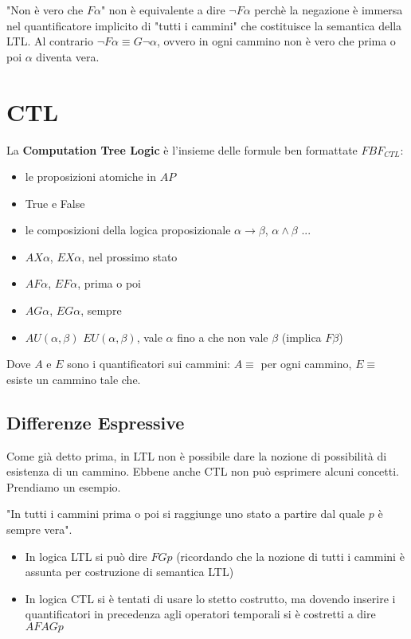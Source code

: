 "Non \`e vero che $F\alpha$" non \`e equivalente a dire $\neg F\alpha$ perch\`e la negazione \`e immersa nel quantificatore implicito di "tutti i cammini" che costituisce la semantica della LTL. Al contrario $\neg F\alpha \equiv G \neg \alpha$, ovvero in ogni cammino non \`e vero che prima o poi $\alpha$ diventa vera.

\section{CTL}

La \textbf{Computation Tree Logic} \`e l'insieme delle formule ben formattate $FBF_{CTL}$:
\begin{itemize}
    \item le proposizioni atomiche in $AP$
    \item True e False
    \item le composizioni della logica proposizionale $\alpha \rightarrow \beta$, $\alpha \land \beta$ ...
    \item $AX\alpha$, $EX\alpha$, nel prossimo stato
    \item $AF\alpha$, $EF\alpha$, prima o poi
    \item $AG\alpha$, $EG\alpha$, sempre
    \item $AU(\alpha, \beta)$ $EU(\alpha, \beta)$, vale $\alpha$ fino a che non vale $\beta$ (implica $F\beta$)
\end{itemize}

Dove $A$ e $E$ sono i quantificatori sui cammini: $A \equiv$ per ogni cammino, $E \equiv$ esiste un cammino tale che.

\subsection{Differenze Espressive}

Come gi\`a detto prima, in LTL non \`e possibile dare la nozione di possibilit\`a di esistenza di un cammino. Ebbene anche CTL non pu\`o esprimere alcuni concetti. Prendiamo un esempio.

"In tutti i cammini prima o poi si raggiunge uno stato a partire dal quale $p$ \`e sempre vera".

\begin{itemize}
  \item In logica LTL si pu\`o dire $FGp$ (ricordando che la nozione di tutti i cammini \`e assunta per costruzione di semantica LTL)
  \item In logica CTL si \`e tentati di usare lo stetto costrutto, ma dovendo inserire i quantificatori in precedenza agli operatori temporali si \`e costretti a dire $AFAGp$
\end{itemize}

